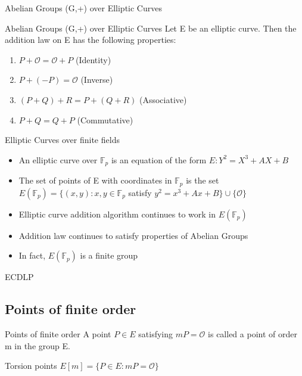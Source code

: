 \documentclass{beamer}
\begin{document}
\begin{frame}{Abelian Groups (G,+) over Elliptic Curves}
\end{frame}

\begin{frame}{Abelian Groups (G,+) over Elliptic Curves}
	Let E be an elliptic curve. Then the addition law on E has the following properties:
	\begin{enumerate}
		\item $P + \mathcal{O} = \mathcal{O} + P$ (Identity)
		\item $P + (-P) = \mathcal{O}$ (Inverse)
		\item $(P + Q) + R = P + (Q + R) $ (Associative)
		\item $P + Q = Q + P$ (Commutative)
	\end{enumerate}
\end{frame}

\begin{frame}{Elliptic Curves over finite fields}
	\begin{itemize}
		\item An elliptic curve over $\mathbb{F}_p$ is an equation of the form $E:Y^2=X^3+AX+B$
		\item The set of points of E with coordinates in $\mathbb{F}_p$ is the set $E(\mathbb{F}_p)=\{(x,y):x,y\in \mathbb{F}_p$ satisfy $y^2=x^3+Ax+B \} \cup \{\mathcal{O}\}$
		\item Elliptic curve addition algorithm continues to work in $E(\mathbb{F}_p)$
		\item Addition law continues to satisfy properties of Abelian Groups
		\item In fact, $E(\mathbb{F}_p)$ is a finite group
	\end{itemize}
\end{frame}

\begin{frame}{ECDLP}
\end{frame}

\subsection{Points of finite order}

\begin{frame}{Points of finite order}
A point $P\in E$ satisfying $mP=\mathcal{O}$ is called a point of order m in the group E.

\begin{block}{Torsion points}
	$E[m] = \{P\in E: mP = \mathcal{O}\}$
\end{block}
\end{frame}
\end{document}
